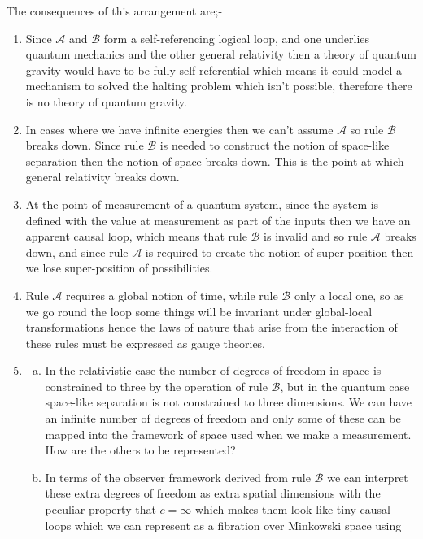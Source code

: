 \documentclass[
   ,final            %
  ]
  {aipproc}
\begin{document}
\par
The consequences of this arrangement are;-
\begin{enumerate}[(1)]
\item Since $\mathcal{A}$ and $\mathcal{B}$ form a self-referencing logical loop, and one underlies quantum mechanics and the other general relativity %
then a theory of quantum gravity would have to be fully self-referential which means it could model a mechanism to solved the halting problem which %
isn't possible, therefore there is no theory of quantum gravity.\\
\item In cases where we have infinite energies then we can't assume $\mathcal{A}$ so rule $\mathcal{B}$ breaks down. Since rule $\mathcal{B}$ is %
needed to construct the notion of space-like separation then the notion of space breaks down. This is the point at which general relativity breaks %
down.
\item At the point of measurement of a quantum system, since the system is defined with the value at measurement as part of the inputs then we have an %
apparent causal loop, which means that rule $\mathcal{B}$ is invalid and so rule $\mathcal{A}$ breaks down, and since rule $\mathcal{A}$ is required %
to create the notion of super-position then we lose super-position of possibilities.
\item
Rule $\mathcal{A}$ requires a global notion of time, while rule $\mathcal{B}$ only a local one, so as we go round the loop some things will be %
invariant under global-local transformations hence the laws of nature that arise from the interaction of these rules must be expressed as gauge %
theories.
\item
\begin{enumerate}[(a)]
\item
In the relativistic case the number of degrees of freedom in space is constrained to three by the operation of rule $\mathcal{B}$, but in the quantum %
case space-like separation is not constrained to three dimensions. We can have an infinite number of degrees of freedom and only some of these can be %
mapped into the framework of space used when we make a measurement. How are the others to be represented? 
\item
In terms of the observer framework derived from rule $\mathcal{B}$ we can interpret these extra degrees of freedom as extra spatial dimensions with %
the peculiar property that $c=\infty$ which makes them look like tiny causal loops which we can represent as a fibration over Minkowski space using %

\end{enumerate}
\end{enumerate}
\end{document}
